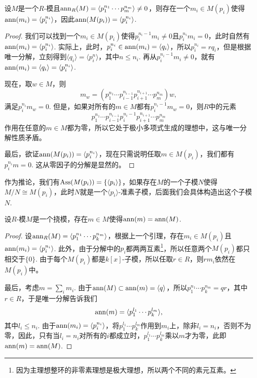 \begin{lem}
    设$M$是一个$R$-模且$\operatorname{ann}_R(M)=\langle p_1^{n_1}\cdots p_m^{n_m}\rangle \neq 0$，则存在一个$m_i\in M(p_i)$使得$\operatorname{ann}(m_i)=\langle p_i^{n_i}\rangle$，因此$\operatorname{ann}(M(p_i))=\langle p_i^{n_i}\rangle$.
\end{lem}

\begin{proof}
    我们可以找到一个$m_i\in M(p_i)$使得$p_i^{n_i-1}m_i\neq 0$且$p_i^{n_i}m_i=0$，此时自然有$\operatorname{ann}(m_i)=\langle p_i^{n_i}\rangle$. 实际上，此时，$p_i^{n_i}\in \operatorname{ann}(m_i)=\langle q_i\rangle$，所以$p_i^{n_i}=rq_i$，但是根据唯一分解，立刻得到$\langle q_i\rangle=\langle p_i^n\rangle$，其中$n\leq n_i$. 再从$p_i^{n_i-1}m_i\neq 0$，就有$\operatorname{ann}(m_i)=\langle q_i\rangle = \langle p_i^{n_i}\rangle$.
    
    现在，取$w\in M$，则
    \[
        m_w=\left(p_1^{n_1}\cdots p_{i-1}^{n_{i-1}}p_{i+1}^{n_{i+1}}\cdots p_{m}^{n_{m}}\right)w,
    \]
    满足$p_i^{n_i}m_w=0$. 但是，如果对所有的$m\in M$都有$p_i^{n_i-1}m_w=0$，则$R$中的元素
    \[
        p_1^{n_1}\cdots p_{i-1}^{n_{i-1}}p_i^{n_i-1}p_{i+1}^{n_{i+1}}\cdots p_{m}^{n_{m}}
    \]
    作用在任意的$m\in M$都为零，所以它处于极小多项式生成的理想中，这与唯一分解性质矛盾。

    最后，欲证$\operatorname{ann}(M(p_i))=\langle p_i^{n_i}\rangle$，现在只需说明任取$m\in M(p_i)$，我们都有$p_i^{n_i}m=0$. 这从零因子的分解是显然的。
\end{proof}

作为推论，我们有$\operatorname{Ass}(M(p_i))=\{\langle p_i\rangle\}$，如果存在$M$的一个子模$N$使得$M/N\cong M(p_i)$，此时$N$就是一个$\langle p_i\rangle$-准素子模，后面我们会具体构造出这个子模$N$.

\begin{pro}
    设$R$-模$M$是一个挠模，存在$m\in M$使得$\operatorname{ann}(m)=\operatorname{ann}(M)$.
\end{pro}

\begin{proof}
    设$\operatorname{ann}_R(M)=\langle p_1^{n_1}\cdots p_k^{n_m}\rangle$，根据上一个引理，存在$m_i\in M(p_i)$且$\operatorname{ann}(m_i)=\langle p_i^{n_i}\rangle$. 此外，由于分解中的$p_i$都两两互素\footnote{因为主理想整环的非零素理想是极大理想，所以两个不同的素元互素。}，所以任意两个$M(p_i)$都只相交于$\{0\}$. 由于每个$M(p_i)$都是$k[x]$-子模，所以任取$r\in R$，则$rm_i$依然在$M(p_i)$中。

    最后，考虑$m=\sum_i m_i$. 由于$\operatorname{ann}(M)\subset \operatorname{ann}(m)=\langle q\rangle$，所以$p_1^{n_1}\cdots p_k^{n_m}=qr$，其中$r\in R$，于是唯一分解告诉我们
    \[
        \operatorname{ann}(m)=\langle p_1^{l_1}\cdots p_k^{l_m}\rangle,
    \]
    其中$l_i\leq n_i$. 由于$\operatorname{ann}(m_i)=\langle p_i^{n_i}\rangle$，将$p_1^{l_1}\cdots p_k^{l_m}$作用到$m_i$上，除非$l_i=n_i$，否则不为零，因此，只有当$l_i=n_i$对所有的$i$都成立时，$p_1^{l_1}\cdots p_k^{l_m}$乘以$m$才为零，此即$\operatorname{ann}(m)=\operatorname{ann}(M)$.
\end{proof}

